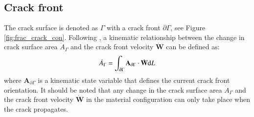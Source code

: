 \documentclass[11pt]{acmeArticle}
\numberwithin{equation}{section}
\begin{document}
\subsection{Crack front}
The crack surface is denoted as $\Gamma$ with a crack front $\partial \Gamma$, see Figure \ref{fig:frac_crack_con}.  Following \citep{kaczmarczyk2014three}, a kinematic relationship between the change in crack surface area $\dot A_\Gamma$ and the crack front velocity $\mathbf{\dot W}$ can be defined as:
\begin{equation}\label{eq:crack_front}
\dot A_\Gamma = \int_{\partial \Gamma} \mathbf A_{\partial \Gamma} \cdot {\dot {\boldsymbol {\rm W} } } \mathrm d L 
\end{equation}
where $ \mathbf A_{\partial \Gamma}$ is a kinematic state variable that defines the current crack front orientation. It should be noted that any change in the crack surface area $\dot A_\Gamma $ and the crack front velocity $\mathbf {\dot W}$ in the material configuration can only take place when the crack propagates. 
\end{document}

